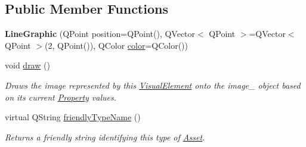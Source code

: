 \subsection*{Public Member Functions}
\begin{DoxyCompactItemize}
\item 
\hypertarget{class_picto_1_1_line_graphic_a4ded65897b52801f24b2308a403580cf}{{\bfseries Line\-Graphic} (Q\-Point position=Q\-Point(), Q\-Vector$<$ Q\-Point $>$=Q\-Vector$<$ Q\-Point $>$(2, Q\-Point()), Q\-Color \hyperlink{struct_picto_1_1_visual_element_a45c3042c969717eb2ab60373369c7de7}{color}=Q\-Color())}\label{class_picto_1_1_line_graphic_a4ded65897b52801f24b2308a403580cf}

\item 
\hypertarget{class_picto_1_1_line_graphic_af0a6b33333edf81c363451a5e2a08f53}{void \hyperlink{class_picto_1_1_line_graphic_af0a6b33333edf81c363451a5e2a08f53}{draw} ()}\label{class_picto_1_1_line_graphic_af0a6b33333edf81c363451a5e2a08f53}

\begin{DoxyCompactList}\small\item\em Draws the image represented by this \hyperlink{struct_picto_1_1_visual_element}{Visual\-Element} onto the image\-\_\- object based on its current \hyperlink{class_picto_1_1_property}{Property} values. \end{DoxyCompactList}\item 
virtual Q\-String \hyperlink{class_picto_1_1_line_graphic_aa6ce32df42927c970d971cf4be297755}{friendly\-Type\-Name} ()
\begin{DoxyCompactList}\small\item\em Returns a friendly string identifying this type of \hyperlink{class_picto_1_1_asset}{Asset}. \end{DoxyCompactList}\end{DoxyCompactItemize}
